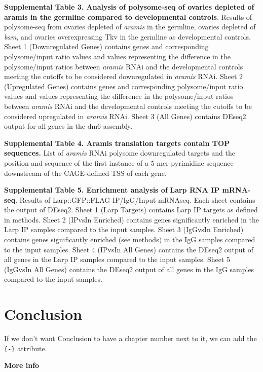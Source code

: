 \documentclass[12pt,twoside]{reedthesis}
\begin{document}
\textbf{Supplemental Table 3. Analysis of polysome-seq of ovaries depleted of
aramis in the germline compared to developmental controls}. Results of
polysome-seq from ovaries depleted of \emph{aramis} in the germline, ovaries
depleted of \emph{bam}, and ovaries overexpressing Tkv in the germline as
developmental controls. Sheet 1 (Downregulated Genes) contains genes and
corresponding polysome/input ratio values and values representing the
difference in the polysome/input ratios between \emph{aramis} RNAi and the
developmental controls meeting the cutoffs to be considered
downregulated in \emph{aramis} RNAi. Sheet 2 (Upregulated Genes) contains
genes and corresponding polysome/input ratio values and values
representing the difference in the polysome/input ratios between
\emph{aramis} RNAi and the developmental controls meeting the cutoffs to be
considered upregulated in \emph{aramis} RNAi. Sheet 3 (All Genes) contains
DEseq2 output for all genes in the dm6 assembly.

\textbf{Supplemental Table 4. Aramis translation targets contain TOP
sequences.} List of \emph{aramis} RNAi polysome downregulated targets and
the position and sequence of the first instance of a 5-mer pyrimidine
sequence downstream of the CAGE-defined TSS of each gene.

\textbf{Supplemental Table 5. Enrichment analysis of} \textbf{Larp RNA IP
mRNA-seq}. Results of Larp::GFP::FLAG IP/IgG/Input mRNAseq. Each sheet
contains the output of DEseq2. Sheet 1 (Larp Targets) contains Larp IP
targets as defined in methods. Sheet 2 (IPvsIn Enriched) contains genes
significantly enriched in the Larp IP samples compared to the input
samples. Sheet 3 (IgGvsIn Enriched) contains genes significantly
enriched (see methods) in the IgG samples compared to the input samples.
Sheet 4 (IPvsIn All Genes) contains the DEseq2 output of all genes in
the Larp IP samples compared to the input samples. Sheet 5 (IgGvsIn All
Genes) contains the DEseq2 output of all genes in the IgG samples
compared to the input samples.

\hypertarget{conclusion}{%
\chapter*{Conclusion}\label{conclusion}}

If we don't want Conclusion to have a chapter number next to it, we can add the \texttt{\{-\}} attribute.

\textbf{More info}
\end{document}
